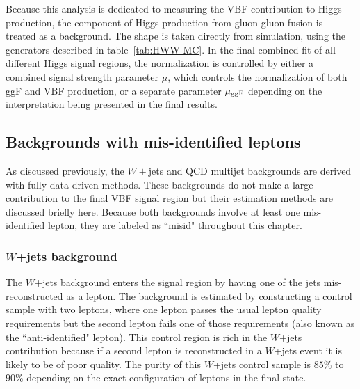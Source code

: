 Because this analysis is dedicated to measuring the VBF contribution to Higgs production, the component of Higgs production from gluon-gluon fusion is treated as a background. The shape is taken directly from simulation, using the generators described in table~\ref{tab:HWW-MC}. In the final combined fit of all different Higgs signal regions, the normalization is controlled by either a combined signal strength parameter $\mu$, which controls the normalization of both ggF and VBF production, or a separate parameter $\mu_{\rm ggF}$ depending on the interpretation being presented in the final results.  

\subsection{Backgrounds with mis-identified leptons}

As discussed previously, the $W+$jets and QCD multijet backgrounds are derived with fully data-driven methods. These backgrounds do not make a large contribution to the final VBF signal region but their estimation methods are discussed briefly here. Because both backgrounds involve at least one mis-identified lepton, they are labeled as ``misid" throughout this chapter.

\subsubsection{$W$+jets background}

The $W$+jets background enters the signal region by having one of the jets mis-reconstructed as a lepton. The background is estimated by constructing a control sample with two leptons, where one lepton passes the usual lepton quality requirements but the second lepton fails one of those requirements (also known as the ``anti-identified" lepton). This control region is rich in the $W$+jets contribution because if a second lepton is reconstructed in a $W$+jets event it is likely to be of poor quality. The purity of this $W$+jets control sample is $85$\% to $90$\% depending on the exact configuration of leptons in the final state.


